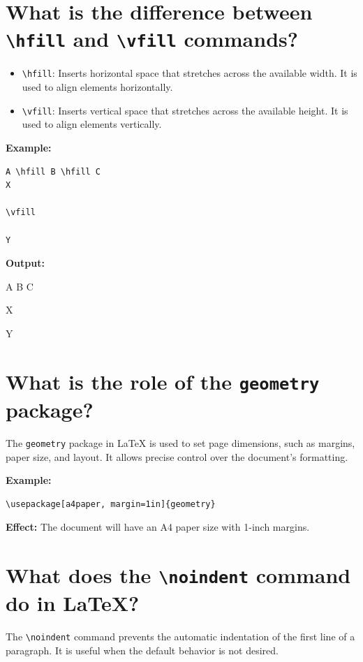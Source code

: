 
\section{What is the difference between \texttt{\textbackslash hfill} and \texttt{\textbackslash vfill} commands?}
\begin{itemize}
    \item \texttt{\textbackslash hfill}: Inserts horizontal space that stretches across the available width. It is used to align elements horizontally.
    \item \texttt{\textbackslash vfill}: Inserts vertical space that stretches across the available height. It is used to align elements vertically.
\end{itemize}


\textbf{Example:}
\begin{verbatim}
A \hfill B \hfill C
X

\vfill

Y
\end{verbatim}

\textbf{Output:}

A \hfill B \hfill C  

X  

\vfill  

Y  

\section{What is the role of the \texttt{geometry} package?}
The \texttt{geometry} package in LaTeX is used to set page dimensions, such as margins, paper size, and layout. It allows precise control over the document's formatting.


\textbf{Example:}
\begin{verbatim}
\usepackage[a4paper, margin=1in]{geometry}
\end{verbatim}

\textbf{Effect:} The document will have an A4 paper size with 1-inch margins.

\section{What does the \texttt{\textbackslash noindent} command do in LaTeX?}
The \texttt{\textbackslash noindent} command prevents the automatic indentation of the first line of a paragraph. It is useful when the default behavior is not desired.

